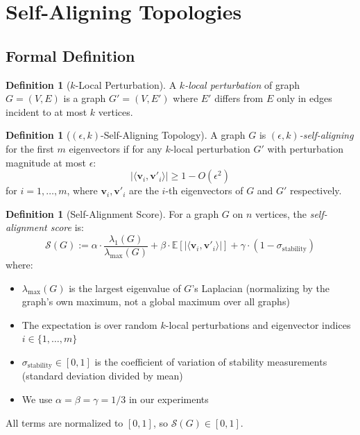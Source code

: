 \documentclass[11pt,a4paper]{article}
\theoremstyle{definition}
\newtheorem{definition}[theorem]{Definition}
\theoremstyle{remark}
\newcommand{\inner}[2]{\langle #1, #2 \rangle}
\begin{document}
\section{Self-Aligning Topologies}
\label{sec:self-alignment}

\subsection{Formal Definition}

\begin{definition}[$k$-Local Perturbation]
A \emph{$k$-local perturbation} of graph $G = (V, E)$ is a graph $G' = (V, E')$ where $E'$ differs from $E$ only in edges incident to at most $k$ vertices.
\end{definition}

\begin{definition}[$(\epsilon, k)$-Self-Aligning Topology]
\label{def:self-aligning}
A graph $G$ is \emph{$(\epsilon, k)$-self-aligning} for the first $m$ eigenvectors if for any $k$-local perturbation $G'$ with perturbation magnitude at most $\epsilon$:
\[
|\inner{\mathbf{v}_i}{\mathbf{v}'_i}| \geq 1 - O(\epsilon^2)
\]
for $i = 1, \ldots, m$, where $\mathbf{v}_i, \mathbf{v}'_i$ are the $i$-th eigenvectors of $G$ and $G'$ respectively.
\end{definition}

\begin{definition}[Self-Alignment Score]
\label{def:sas}
For a graph $G$ on $n$ vertices, the \emph{self-alignment score} is:
\[
\mathcal{S}(G) := \alpha \cdot \frac{\lambda_1(G)}{\lambda_{\max}(G)} + \beta \cdot \mathbb{E}[|\inner{\mathbf{v}_i}{\mathbf{v}'_i}|] + \gamma \cdot (1 - \sigma_{\text{stability}})
\]
where:
\begin{itemize}
    \item $\lambda_{\max}(G)$ is the largest eigenvalue of $G$'s Laplacian (normalizing by the graph's own maximum, not a global maximum over all graphs)
    \item The expectation is over random $k$-local perturbations and eigenvector indices $i \in \{1, \ldots, m\}$
    \item $\sigma_{\text{stability}} \in [0, 1]$ is the coefficient of variation of stability measurements (standard deviation divided by mean)
    \item We use $\alpha = \beta = \gamma = 1/3$ in our experiments
\end{itemize}
All terms are normalized to $[0, 1]$, so $\mathcal{S}(G) \in [0, 1]$.
\end{definition}
\end{document}
